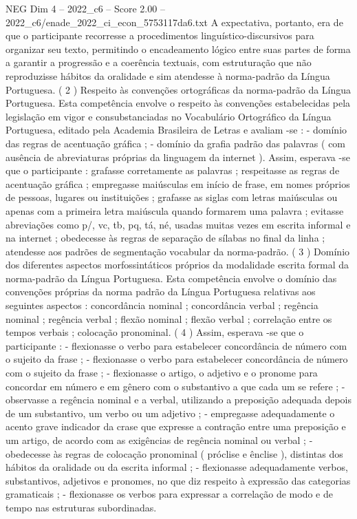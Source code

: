 \begin{textsample}{NEG Dim 4 – 2022\_c6 – Score 2.00 – 2022\_c6/enade\_2022\_ci\_econ\_5753117da6.txt}
A expectativa, portanto, era de que o participante recorresse a procedimentos linguístico-discursivos para organizar seu texto, permitindo o encadeamento lógico entre suas partes de forma a garantir a progressão e a coerência textuais, com estruturação que não reproduzisse hábitos da oralidade e sim atendesse à norma-padrão da Língua Portuguesa. ( 2 ) Respeito às convenções ortográficas da norma-padrão da Língua Portuguesa.
Esta competência envolve o respeito às convenções estabelecidas pela legislação em vigor e consubstanciadas no Vocabulário Ortográfico da Língua Portuguesa, editado pela Academia Brasileira de Letras e avaliam -se : - domínio das regras de acentuação gráfica ; - domínio da grafia padrão das palavras ( com ausência de abreviaturas próprias da linguagem da internet ).
Assim, esperava -se que o participante : grafasse corretamente as palavras ; respeitasse as regras de acentuação gráfica ; empregasse maiúsculas em início de frase, em nomes próprios de pessoas, lugares ou instituições ; grafasse as siglas com letras maiúsculas ou apenas com a primeira letra maiúscula quando formarem uma palavra ; evitasse abreviações como p/, vc, tb, pq, tá, né, usadas muitas vezes em escrita informal e na internet ; obedecesse às regras de separação de sílabas no final da linha ; atendesse aos padrões de segmentação vocabular da norma-padrão. ( 3 ) Domínio dos diferentes aspectos morfossintáticos próprios da modalidade escrita formal da norma-padrão da Língua Portuguesa.
Esta competência envolve o domínio das convenções próprias da norma padrão da Língua Portuguesa relativas aos seguintes aspectos : concordância nominal ; concordância verbal ; regência nominal ; regência verbal ; flexão nominal ; flexão verbal ; correlação entre os tempos verbais ; colocação pronominal. ( 4 ) Assim, esperava -se que o participante : - flexionasse o verbo para estabelecer concordância de número com o sujeito da frase ; - flexionasse o verbo para estabelecer concordância de número com o sujeito da frase ; - flexionasse o artigo, o adjetivo e o pronome para concordar em número e em gênero com o substantivo a que cada um se refere ; - observasse a regência nominal e a verbal, utilizando a preposição adequada depois de um substantivo, um verbo ou um adjetivo ; - empregasse adequadamente o acento grave indicador da crase que expresse a contração entre uma preposição e um artigo, de acordo com as exigências de regência nominal ou verbal ; - obedecesse às regras de colocação pronominal ( próclise e ênclise ), distintas dos hábitos da oralidade ou da escrita informal ; - flexionasse adequadamente verbos, substantivos, adjetivos e pronomes, no que diz respeito à expressão das categorias gramaticais ; - flexionasse os verbos para expressar a correlação de modo e de tempo nas estruturas subordinadas.

\end{textsample}
